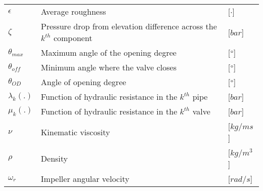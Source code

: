 \begin{tabular}{l l l}
	$\epsilon$		&	Average roughness									     	& [$\cdot$]\\
	$\zeta$			&	Pressure drop from elevation difference across the $k^{th}$ component	& [$bar$]\\
	$\theta_{max}$	&	Maximum angle of the opening degree						    & [$\degree$]\\
	$\theta_{off}$	&	Minimum angle where the valve closes						& [$\degree$]\\
	$\theta_{OD}$	&	Angle of opening degree										& [$\degree$]\\
	$\lambda_k(.)$	&	Function of hydraulic resistance in the $k^{th}$ pipe		& [$bar$]\\
	$\mu_k(.)$		&	Function of hydraulic resistance in the $k^{th}$ valve		& [$bar$]\\
	$\nu$			&	Kinematic viscosity									     	& [$kg/ms$]\\
	$\rho$			&	Density									     				& [$kg/m^3$]\\
	$\omega_r$		&	Impeller angular velocity									& [$rad/s$]\\
	
\end{tabular}



